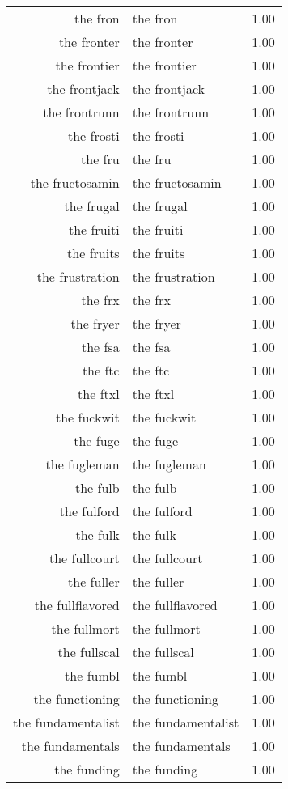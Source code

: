 \begin{table}[ht]
\begin{tabular}{rlr}
  the fron & the fron & 1.00 \\ 
  the fronter & the fronter & 1.00 \\ 
  the frontier & the frontier & 1.00 \\ 
  the frontjack & the frontjack & 1.00 \\ 
  the frontrunn & the frontrunn & 1.00 \\ 
  the frosti & the frosti & 1.00 \\ 
  the fru & the fru & 1.00 \\ 
  the fructosamin & the fructosamin & 1.00 \\ 
  the frugal & the frugal & 1.00 \\ 
  the fruiti & the fruiti & 1.00 \\ 
  the fruits & the fruits & 1.00 \\ 
  the frustration & the frustration & 1.00 \\ 
  the frx & the frx & 1.00 \\ 
  the fryer & the fryer & 1.00 \\ 
  the fsa & the fsa & 1.00 \\ 
  the ftc & the ftc & 1.00 \\ 
  the ftxl & the ftxl & 1.00 \\ 
  the fuckwit & the fuckwit & 1.00 \\ 
  the fuge & the fuge & 1.00 \\ 
  the fugleman & the fugleman & 1.00 \\ 
  the fulb & the fulb & 1.00 \\ 
  the fulford & the fulford & 1.00 \\ 
  the fulk & the fulk & 1.00 \\ 
  the fullcourt & the fullcourt & 1.00 \\ 
  the fuller & the fuller & 1.00 \\ 
  the fullflavored & the fullflavored & 1.00 \\ 
  the fullmort & the fullmort & 1.00 \\ 
  the fullscal & the fullscal & 1.00 \\ 
  the fumbl & the fumbl & 1.00 \\ 
  the functioning & the functioning & 1.00 \\ 
  the fundamentalist & the fundamentalist & 1.00 \\ 
  the fundamentals & the fundamentals & 1.00 \\ 
  the funding & the funding & 1.00 \\ 

\end{tabular}
\end{table}
